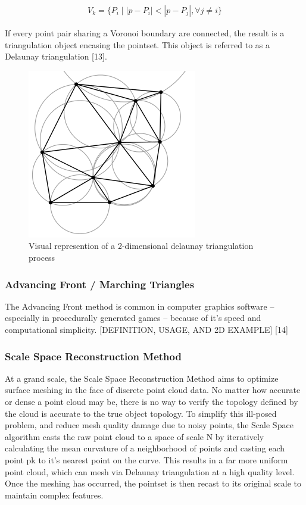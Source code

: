 \documentclass[12pt]{drexelthesis}
\begin{document}
\begin{gather*}
	V_{k} = \{P_{i} \mid |p - P_{i}| < |p - P_{j}|, \forall j \neq i \}
\end{gather*}

If every point pair sharing a Voronoi boundary are connected, the result is a triangulation object encasing the pointset. This object is referred to as a Delaunay triangulation [13].

\begin{figure}
\centering
\includegraphics{delaunay.png}
\caption[2D delaunay triangulation]{Visual represention of a 2-dimensional delaunay triangulation process}
\end{figure}

\subsubsection{Advancing Front / Marching Triangles}
The Advancing Front method is common in computer graphics software – especially in procedurally generated games – because of it’s speed and computational simplicity.
[DEFINITION, USAGE, AND 2D EXAMPLE]
 [14]

\subsubsection{Scale Space Reconstruction Method}
At a grand scale, the Scale Space Reconstruction Method aims to optimize surface meshing in the face of discrete point cloud data. No matter how accurate or dense a point cloud may be, there is no way to verify the topology defined by the cloud is accurate to the true object topology. To simplify this ill-posed problem, and reduce mesh quality damage due to noisy points, the Scale Space algorithm casts the raw point cloud to a space of scale N by iteratively calculating the mean curvature of a neighborhood of points and casting each point pk to it’s nearest point on the curve. This results in a far more uniform point cloud, which can mesh via Delaunay triangulation at a high quality level. Once the meshing has occurred, the pointset is then recast to its original scale to maintain complex features. 
\end{document}
